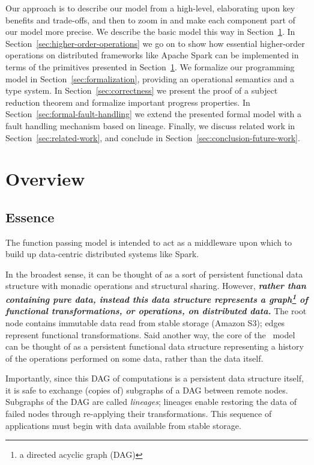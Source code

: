 \documentclass{jfp1}
\begin{document}
Our approach is to describe our model from a high-level, elaborating
upon key benefits and trade-offs, and then to zoom in and make each
component part of our model more precise. We describe the basic model
this way in Section~\ref{sec:basic-model}. In
Section~\ref{sec:higher-order-operations} we go on to show how
essential higher-order operations on distributed frameworks like
Apache Spark can be implemented in terms of the primitives presented
in Section~\ref{sec:basic-model}. We formalize our programming model
in Section~\ref{sec:formalization}, providing an operational semantics
and a type system. In Section~\ref{sec:correctness} we present the
proof of a subject reduction theorem and formalize important progress
properties. In Section~\ref{sec:formal-fault-handling} we extend the
presented formal model with a fault handling mechanism based on
lineage. Finally, we discuss related work in
Section~\ref{sec:related-work}, and conclude in
Section~\ref{sec:conclusion-future-work}.

\section{Overview}
\label{sec:basic-model}

\subsection{Essence}

The function passing model is intended to act as a 
middleware upon which to build up data-centric distributed systems like Spark. 

In the broadest sense, it can be thought of as a sort of
persistent functional data structure with monadic operations and structural
sharing. However, {\bf\em rather than containing pure data, instead this data structure
represents a graph\footnote{a directed acyclic graph (DAG)} of functional transformations,
or operations, on distributed data.} The root node contains immutable data read from stable storage 
(\eg Amazon S3); edges represent functional transformations. 
Said another way, the core of the \FP~model can be thought of as a persistent functional 
data structure representing a history of the operations performed on some data, rather
than the data itself.

Importantly, since this DAG of computations is a persistent data structure
itself, it is safe to exchange (copies of) subgraphs of a DAG between remote
nodes. 
Subgraphs of the DAG are called \textit{lineages}; lineages enable restoring the 
data of failed nodes through re-applying their transformations. This sequence of 
applications must begin with data available from stable storage.
\end{document}
